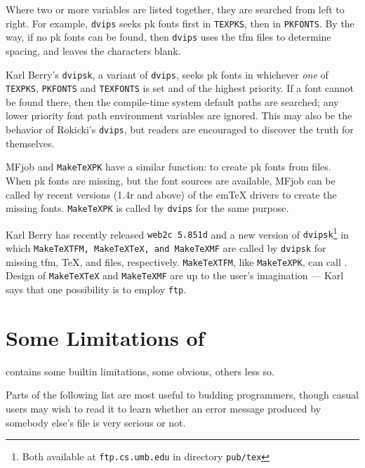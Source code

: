 Where two or more variables are listed together, they are
searched from left to right.  For example, {\tt dvips} seeks {\sc pk}
fonts first in {\tt TEXPKS}, then in {\tt PKFONTS}.
By the way, if no {\sc pk} fonts can be found, then {\tt dvips}
uses the {\sc tfm} files to determine spacing, and leaves the
characters blank.

Karl {\sc Berry}'s {\tt dvipsk}, a variant of {\tt dvips},
seeks {\sc pk} fonts in whichever {\em one} of {\tt TEXPKS},
{\tt PKFONTS} and {\tt TEXFONTS} is set and of the highest priority.
If a font cannot be found there, then the compile-time system default
paths are searched; any lower priority font path environment variables
are ignored.  This may also be the behavior of Rokicki's {\tt dvips},
but readers are encouraged to discover the truth for themselves.

{\sf MFjob} and {\tt MakeTeXPK} have a similar function:
to create {\sc pk} fonts from \MF{} files.
When {\sc pk} fonts are missing, but the \MF{} font sources
are available,
{\sf MFjob} can be called by recent versions (1.4r and above)
of the em\TeX{} drivers to create the missing fonts.
{\tt MakeTeXPK} is called by {\tt dvips} for the same purpose.

Karl {\sc Berry} has recently released {\tt web2c 5.851d}
and a new version of {\tt dvipsk}\footnote
{Both available at {\tt ftp.cs.umb.edu} in directory {\tt pub/tex}}
in which {\tt MakeTeXTFM, MakeTeXTeX, and MakeTeXMF} are called
by {\tt dvipsk} for missing {\sc tfm}, \TeX{}, and \MF{} files,
respectively.  {\tt MakeTeXTFM}, like {\tt MakeTeXPK}, can call
\MF{}.  Design of {\tt MakeTeXTeX} and {\tt MakeTeXMF} are
up to the user's imagination --- Karl says that one possibility
is to employ {\tt ftp}.


\section{Some Limitations of \MF{}}\label{sec:limit}

\MF{} contains some builtin limitations, some obvious, others
less so.

Parts of the following list are most useful to budding programmers,
though casual users may wish to read it to learn whether
an error message produced by somebody else's \MF{} file is very
serious or not.

